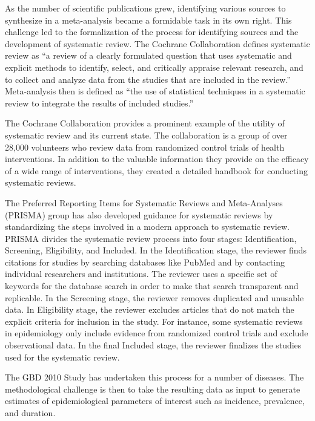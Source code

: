 As the number of scientific publications grew, identifying various
sources to synthesize in a meta-analysis became a formidable task in
its own right. This challenge led to the formalization of the process
for identifying sources and the development of systematic review. The
Cochrane Collaboration defines systematic review as ``a review of a
clearly formulated question that uses systematic and explicit methods
to identify, select, and critically appraise relevant research, and to
collect and analyze data from the studies that are included in the
review.'' Meta-analysis then is defined as ``the use of statistical
techniques in a systematic review to integrate the results of included
studies.'' \cite{Green_Systematic_2005}

The Cochrane Collaboration provides a prominent example of the utility
of systematic review and its current state. The collaboration is a
group of over 28,000 volunteers who review data from randomized
control trials of health interventions.
\cite{Cochrane_Cochrane_2012} In addition to the valuable information
they provide on the efficacy of a wide range of interventions, they
created a detailed handbook for conducting systematic
reviews.

The Preferred Reporting Items for Systematic Reviews and Meta-Analyses
(PRISMA) group has also developed guidance for systematic reviews by
standardizing the steps involved in a modern approach to systematic
review. \cite{Liberati_PRISMA_2009} PRISMA divides the systematic
review process into four stages: Identification, Screening,
Eligibility, and Included.  In the Identification stage, the reviewer
finds citations for studies by searching databases like PubMed and by
contacting individual researchers and institutions. The reviewer uses
a specific set of keywords for the database search in order to make
that search transparent and replicable. In the Screening stage, the
reviewer removes duplicated and unusable data. In Eligibility stage,
the reviewer excludes articles that do not match the explicit criteria
for inclusion in the study. For instance, some systematic reviews in
epidemiology only include evidence from randomized control trials and
exclude observational data. In the final Included stage, the reviewer
finalizes the studies used for the systematic review.

The GBD 2010 Study has undertaken this process for a
number of diseases. The methodological challenge is then to take the
resulting data as input to generate estimates of epidemiological
parameters of interest such as incidence, prevalence, and duration.

